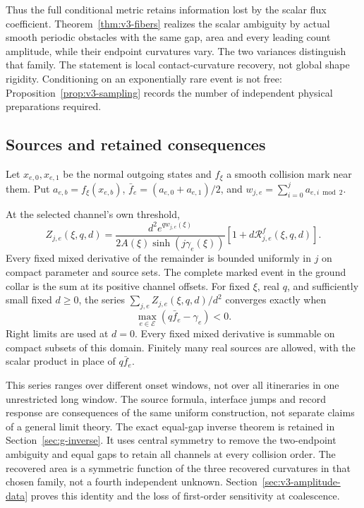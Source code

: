 Thus the full conditional metric retains information lost by the
scalar flux coefficient. Theorem~\ref{thm:v3-fibers} realizes the
scalar ambiguity by actual smooth periodic obstacles with the same gap,
area and every leading count amplitude, while their endpoint curvatures
vary. The two variances distinguish that family. The statement is local
contact-curvature recovery, not global shape rigidity. Conditioning on
an exponentially rare event is not free: Proposition~\ref{prop:v3-sampling}
records the number of independent physical preparations required.

\subsection{Sources and retained consequences}
Let $x_{e,0},x_{e,1}$ be the normal outgoing states and $f_\xi$ a smooth
collision mark near them. Put $a_{e,b}=f_\xi(x_{e,b})$,
$\bar f_e=(a_{e,0}+a_{e,1})/2$, and
$w_{j,e}=\sum_{i=0}^j a_{e,i\bmod2}$.
\begin{theorem}
\label{thm:g-marked}
At the selected channel's own threshold,
\begin{equation}\label{eq:g-marked}
 Z_{j,e}(\xi,q,d)=
 \frac{d^2e^{qw_{j,e}(\xi)}}{2A(\xi)\sinh(j\gamma_e(\xi))}
       [1+d\mathcal R^f_{j,e}(\xi,q,d)].
\end{equation}
Every fixed mixed derivative of the remainder is bounded uniformly in
$j$ on compact parameter and source sets. The complete marked event in
the ground collar is the sum at its positive channel offsets. For fixed
$\xi$, real $q$, and sufficiently small fixed $d\ge0$, the series
$\sum_{j,e}Z_{j,e}(\xi,q,d)/d^2$ converges exactly when
\begin{equation}\label{eq:g-source-domain}
           \max_{e\in\mathcal E}(q\bar f_e-\gamma_e)<0.
\end{equation}
Right limits are used at $d=0$. Every fixed mixed derivative is summable
on compact subsets of this domain. Finitely many real sources are
allowed, with the scalar product in place of $q\bar f_e$.
\end{theorem}

This series ranges over different onset windows, not over all
itineraries in one unrestricted long window. The source formula,
interface jumps and record response are consequences of the same
uniform construction, not separate claims of a general limit theory.
The exact equal-gap inverse theorem is retained in
Section~\ref{sec:g-inverse}. It uses central symmetry to remove the
two-endpoint ambiguity and equal gaps to retain all channels at every
collision order. The recovered area is a symmetric function of the
three recovered curvatures in that chosen family, not a fourth
independent unknown. Section~\ref{sec:v3-amplitude-data} proves this
identity and the loss of first-order sensitivity at coalescence.

